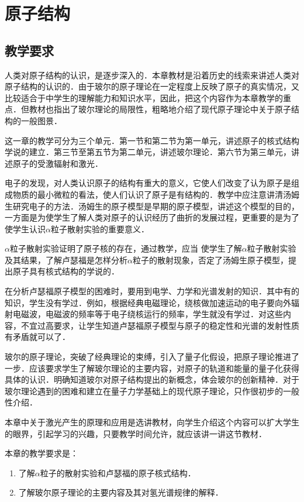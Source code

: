 \chapter{原子结构}\minitoc[n]
\section{教学要求}
人类对原子结构的认识，是逐步深入的．本章教材是沿着历史的线索来讲述人类对原子结构的认识的．由于玻尔的原子理论在一定程度上反映了原子的真实情况，又比较适合于中学生的理解能力和知识水平，因此，把这个内容作为本章教学的重点．但教材也指出了玻尔理论的局限性，粗略地介绍了现代原子理论中关于原子结构的一般图景．

这一章的教学可分为三个单元．第一节和第二节为第一单元，讲述原子的核式结构学说的建立．第三节至第五节为第二单元，讲述玻尔理论．第六节为第三单元，讲述原子的受激辐射和激光．

电子的发现，对人类认识原子的结构有重大的意义，它使人们改变了认为原子是组成物质的最小微粒的看法，使人们认识了原子是有结构的．教学中应注意讲清汤姆生研究电子的方法．汤姆生的原子模型是早期的原子模型，讲述这个模型的目的，一方面是为使学生了解人类对原子的认识经历了曲折的发展过程，更重要的是为了使学生认识$\alpha$粒子散射实验的重要意义．

$\alpha$粒子散射实验证明了原子核的存在，通过教学，应当
使学生了解$\alpha$粒子散射实验及其结果，了解卢瑟福是怎样分析$\alpha$粒子的散射现象，否定了汤姆生原子模型，提出原子具有核式结构的学说的．

在分析卢瑟福原子模型的困难时，要用到电学、力学和光谱发射的知识．其中有的知识，学生没有学过．例如，根据经典电磁理论，绕核做加速运动的电子要向外辐射电磁波，电磁波的频率等于电子绕核运行的频率，学生就没有学过．对这些内容，不宜过高要求，让学生知道卢瑟福原子模型与原子的稳定性和光谱的发射性质有矛盾就可以了．

玻尔的原子理论，突破了经典理论的束缚，引入了量子化假设，把原子理论推进了一步．应该要求学生了解玻尔理论的主要内容，对原子的轨道和能量的量子化获得具体的认识．明确知道玻尔对原子结构提出的新概念，体会玻尔的创新精神．对于玻尔理论遇到的困难和建立在量子力学基础上的现代原子理论，只作很初步的一般性介绍．

本章中关于激光产生的原理和应用是选讲教材，向学生介绍这个内容可以扩大学生的眼界，引起学习的兴趣，只要教学时间允许，就应该讲一讲这节教材．

本章的教学要求是：
\begin{enumerate}
\item 了解$\alpha$粒子的散射实验和卢瑟福的原子核式结构．
\item 了解玻尔原子理论的主要内容及其对氢光谱规律的解释．
\end{enumerate}

